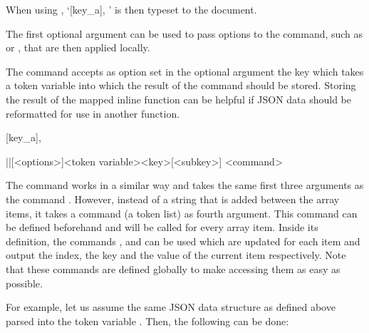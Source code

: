 \documentclass[a4paper]{article}
\begin{document}
{{When using , `[key_a]{, }' is then typeset to the document.

The first optional argument can be used to pass options to the command, such as  or , that are then applied locally.

The command \macro{\JSONParseArrayUse} accepts as option set in the optional argument the key  which takes a token variable into which the result of the command should be stored. Storing the result of the mapped inline function can be helpful if JSON data should be reformatted for use in another function.

\begin{codeexamplecolumns}
[key_a]{,}

\end{codeexamplecolumns}

\begin{macrodef}
|\JSONParseArrayMapFunction|[<options>]{<token variable>}{<key>}[<subkey>]
  {<command>}
\end{macrodef}
The command \macro{\JSONParseArrayMapFunction} works in a similar way and takes the same first three arguments as the command \macro{\JSONParseArrayUse}. However, instead of a string that is added between the array items, it takes a command (a token list) as fourth argument. This command can be defined beforehand and will be called for every array item. Inside its definition, the commands \macro{\JSONParseArrayIndex}, \macro{\JSONParseArrayKey} and \macro{\JSONParseArrayValue} can be used which are updated for each item and output the index, the key and the value of the current item respectively. Note that these commands are defined globally to make accessing them as easy as possible.

For example, let us assume the same JSON data structure as defined above parsed into the token variable \macro{\myJSONdata}. Then, the following can be done:

\begin{codeexamplecolumns}
\newcommand{\myJSONitem}{
  \item \emph{\JSONParseArrayValue}
}


\end{codeexamplecolumns}}}
\end{document}
